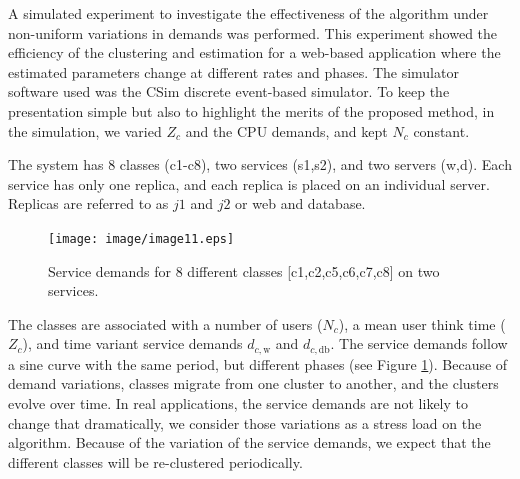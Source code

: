 A simulated experiment to investigate the effectiveness of the algorithm under non-uniform variations in demands was performed. This experiment showed the efficiency of the clustering and estimation for a web-based application where the estimated parameters change at different rates and phases. 
 The simulator software used was the CSim discrete event-based simulator. 
To keep the presentation simple but also to highlight the merits of the proposed method, in the simulation, we varied $Z_c$ and the CPU demands, and kept $N_c$ constant.        


The system has 8 classes (c1-c8), two services (s1,s2), and two servers (w,d). Each service has only one replica, and each replica is placed on an individual server. Replicas are referred to as $j1$ and $j2$ or web and database.        
\begin{figure}[htbp]
	\centering
   \texttt{[image: image/image11.eps]}
	\caption[A sample service demands for 8 different classes on two services.]{Service demands for 8 different classes [c1,c2,c5,c6,c7,c8] on two services.
	}
	\label{fig:service-demands-different-classes}   
\end{figure}
 
 The classes are associated with a number of users ($N_c$), a mean user think time ($Z_c$), and time variant service demands $d_{c,\text{w}}$ and $d_{c,\text{db}}$. The service demands follow a sine curve with the same period, but different phases (see Figure \ref{fig:service-demands-different-classes}). Because of demand variations, classes migrate from one cluster to another, and the clusters evolve over time. In real applications, the service demands are not likely to change that dramatically, we consider those variations as a stress load on the algorithm. Because of the variation of the service demands, we expect that the different classes will be re-clustered periodically.                                                                     

